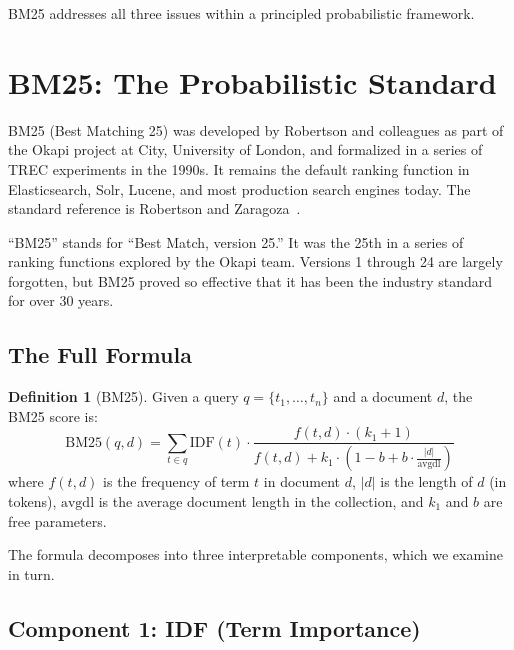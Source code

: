 \documentclass[11pt,a4paper]{article}
\theoremstyle{definition}
\newtheorem{definition}{Definition}[section]
\theoremstyle{plain}
\begin{document}
BM25 addresses all three issues within a principled probabilistic framework.


\section{BM25: The Probabilistic Standard}
\label{sec:bm25}

BM25 (Best Matching 25) was developed by Robertson and colleagues as part of the Okapi project at City, University of London, and formalized in a series of TREC experiments in the 1990s. It remains the default ranking function in Elasticsearch, Solr, Lucene, and most production search engines today. The standard reference is Robertson and Zaragoza~\cite{robertson2009probabilistic}.

\begin{historical}
``BM25'' stands for ``Best Match, version 25.'' It was the 25th in a series of ranking functions explored by the Okapi team. Versions 1 through 24 are largely forgotten, but BM25 proved so effective that it has been the industry standard for over 30 years.
\end{historical}

\subsection{The Full Formula}

\begin{definition}[BM25]
Given a query $q = \{t_1, \ldots, t_n\}$ and a document $d$, the BM25 score is:
\begin{equation}
\text{BM25}(q, d) = \sum_{t \in q} \text{IDF}(t) \cdot \frac{f(t,d) \cdot (k_1 + 1)}{f(t,d) + k_1 \cdot \left(1 - b + b \cdot \frac{|d|}{\text{avgdl}}\right)}
\label{eq:bm25}
\end{equation}
where $f(t,d)$ is the frequency of term $t$ in document $d$, $|d|$ is the length of $d$ (in tokens), $\text{avgdl}$ is the average document length in the collection, and $k_1$ and $b$ are free parameters.
\end{definition}

The formula decomposes into three interpretable components, which we examine in turn.

\subsection{Component 1: IDF (Term Importance)}
\end{document}
